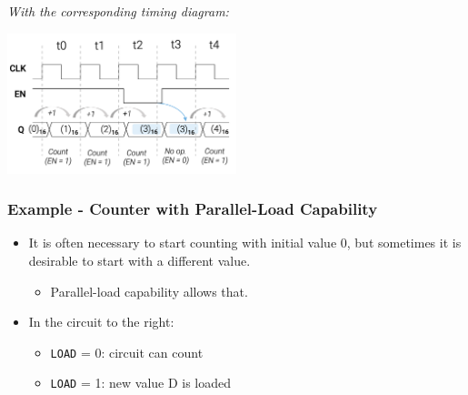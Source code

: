 \documentclass[12pt,openany]{book}
\begin{document}
\vspace*{10px}
\newline
\textit{With the corresponding timing diagram:}
\begin{center}
	\includegraphics*[width=0.5\textwidth]{circuits/14.5_2.png}
\end{center}
\newpage


\subsubsection{Example - Counter with Parallel-Load Capability}
\begin{minipage}{0.45\textwidth}
	\begin{itemize}
		\item[] It is often necessary to start counting with initial value 0, but sometimes it is desirable to start with a different value.
		\begin{itemize}
			\item Parallel-load capability allows that.
		\end{itemize}
		\item[] In the circuit to the right:
		\begin{itemize}
			\item \texttt{LOAD} = 0: circuit can count
			\item \texttt{LOAD} = 1: new value D is loaded
		\end{itemize}
	\end{itemize}
\end{minipage}
\hfill
\vline
\hfill
\end{document}
